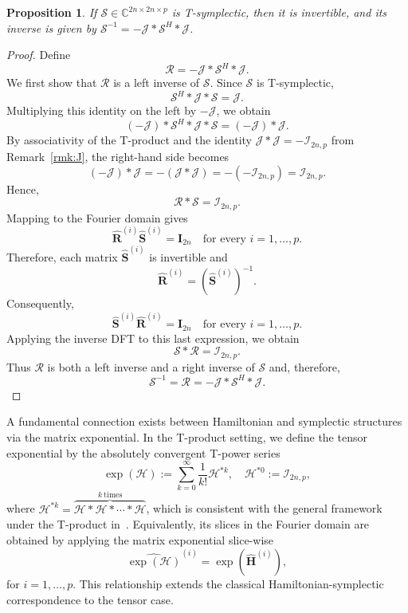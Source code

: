 \documentclass[pdflatex,sn-mathphys-ay]{sn-jnl}
\newcommand{\T}[1]{\mathcal{#1}}    %
\newcommand{\M}[1]{\bm{#1}}     %
\newcommand{\C}{\mathbb{C}}         %
\theoremstyle{thmstyleone}
\newtheorem{proposition}[theorem]{Proposition}
\theoremstyle{thmstyletwo}
\theoremstyle{thmstylethree}
\numberwithin{equation}{section}
\begin{document}
\begin{proposition}
If $\T{S} \in \C^{2n \times 2n \times p}$ is T-symplectic, then it is invertible, and its inverse is given by $\T{S}^{-1} = -\T{J} * \T{S}^H * \T{J}$.
\end{proposition}
\begin{proof}
Define
$$
\T{R} = -\T{J} * \T{S}^H * \T{J}.
$$
We first show that $\T{R}$ is a left inverse of $\T{S}$. Since $\T{S}$ is T-symplectic,
$$
\T{S}^H * \T{J} * \T{S} = \T{J}.
$$
Multiplying this identity on the left by $-\T{J}$, we obtain
$$
(-\T{J}) * \T{S}^H * \T{J} * \T{S} = (-\T{J}) * \T{J}.
$$
By associativity of the T-product and the identity $\T{J} * \T{J} = -\T{I}_{2n,p}$ from Remark~\ref{rmk:J}, the right-hand side becomes
$$
(-\T{J}) * \T{J} = -(\T{J} * \T{J}) = -(-\T{I}_{2n,p}) = \T{I}_{2n,p}.
$$
Hence,
$$
\T{R} * \T{S} = \T{I}_{2n,p}.
$$
Mapping to the Fourier domain gives
$$
\widehat{\M{R}}^{(i)}\widehat{\M{S}}^{(i)} = \M{I}_{2n}
\quad \text{for every } i=1,\dots,p.
$$
Therefore, each matrix $\widehat{\M{S}}^{(i)}$ is invertible and
$$
\widehat{\M{R}}^{(i)} = (\widehat{\M{S}}^{(i)})^{-1}.
$$
Consequently,
$$
\widehat{\M{S}}^{(i)}\widehat{\M{R}}^{(i)} = \M{I}_{2n}
\quad \text{for every } i=1,\dots,p.
$$
Applying the inverse DFT to this last expression, we obtain
$$
\T{S} * \T{R} = \T{I}_{2n,p}.
$$
Thus $\T{R}$ is both a left inverse and a right inverse of $\T{S}$ and, therefore,
$$
\T{S}^{-1} = \T{R} = -\T{J} * \T{S}^H * \T{J}.
$$
\end{proof}

A fundamental connection exists between Hamiltonian and symplectic structures via the matrix exponential. In the T-product setting, we define the tensor exponential by the absolutely convergent T-power series
\begin{equation*}
\exp(\T{H}) := \sum_{k=0}^{\infty} \frac{1}{k!}\T{H}^{*k}, \quad 
\T{H}^{*0} := \T{I}_{2n,p},
\end{equation*}
where $\T{H}^{*k} = \overbrace{\T{H}*\T{H}*\cdots*\T{H}}^{k~\text{times}}$, which is consistent with the general framework under the T-product in~\cite{ju2025geometric}. Equivalently, its slices in the Fourier domain are obtained by applying the matrix exponential slice-wise
\begin{equation*}
\widehat{\exp(\T{H})}^{(i)} = \exp(\widehat{\M{H}}^{(i)}),
\end{equation*}
for $i=1,\dots,p$.
This relationship extends the classical Hamiltonian-symplectic correspondence to the tensor case.
\end{document}
